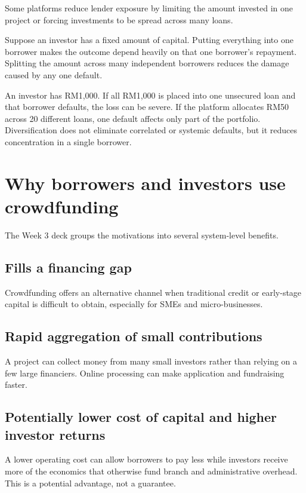 Some platforms reduce lender exposure by limiting the amount invested in one project or forcing investments to be spread across many loans.

Suppose an investor has a fixed amount of capital. Putting everything into one borrower makes the outcome depend heavily on that one borrower's repayment. Splitting the amount across many independent borrowers reduces the damage caused by any one default.

\begin{workedexample}
An investor has RM1,000. If all RM1,000 is placed into one unsecured loan and that borrower defaults, the loss can be severe. If the platform allocates RM50 across 20 different loans, one default affects only part of the portfolio. Diversification does not eliminate correlated or systemic defaults, but it reduces concentration in a single borrower.
\end{workedexample}

\section{Why borrowers and investors use crowdfunding}

The Week 3 deck groups the motivations into several system-level benefits.

\subsection{Fills a financing gap}

Crowdfunding offers an alternative channel when traditional credit or early-stage capital is difficult to obtain, especially for SMEs and micro-businesses.

\subsection{Rapid aggregation of small contributions}

A project can collect money from many small investors rather than relying on a few large financiers. Online processing can make application and fundraising faster.

\subsection{Potentially lower cost of capital and higher investor returns}

A lower operating cost can allow borrowers to pay less while investors receive more of the economics that otherwise fund branch and administrative overhead. This is a potential advantage, not a guarantee.

